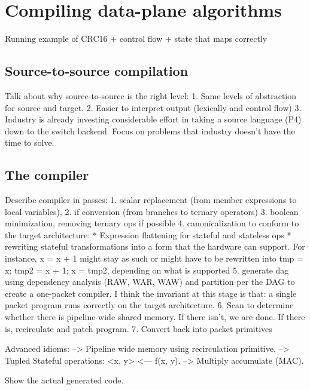 \section{Compiling data-plane algorithms}
\label{s:compiler}
Running example of CRC16 + control flow + state
that maps correctly

\subsection{Source-to-source compilation}
Talk about why source-to-source is the right level:
1. Same levels of abstraction for source and target.
2. Easier to interpret output (lexically and control flow)
3. Industry is already investing considerable effort in taking a source language (P4) down to the switch backend.
Focus on problems that industry doesn't have the time to solve.

\subsection{The compiler}
Describe compiler in passes:
1. scalar replacement (from member expressions to local variables),
2. if conversion (from branches to ternary operators)
3. boolean minimization, removing ternary ops if possible
4. canonicalization to conform to the target architecture:
 * Expression flattening for stateful and stateless ops
 * rewriting stateful transformations into a form that the hardware can support. For instance, x = x + 1 might stay as such or might have to be rewritten into tmp = x; tmp2 = x + 1; x = tmp2, depending on what is supported
5. generate dag using dependency analysis (RAW, WAR, WAW) and partition per the DAG to create a one-packet compiler. I think the invariant at this stage is that: a single packet program runs correctly on the target architecture.
6. Scan to determine whether there is pipeline-wide shared memory. If there isn't, we are done. If there is, recirculate and patch program.
7. Convert back into packet primitives

Advanced idioms:
--> Pipeline wide memory using recirculation primitive.
--> Tupled Stateful operations: <x, y> <--- f(x, y).
--> Multiply accumulate (MAC).

Show the actual generated code.
